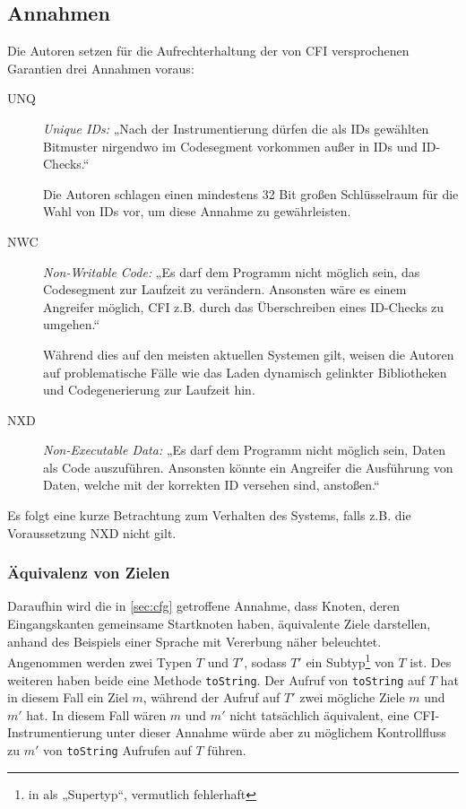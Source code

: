 \documentclass[11pt]{article}
\begin{document}
\subsection{Annahmen}


Die Autoren setzen für die Aufrechterhaltung der von CFI versprochenen
Garantien drei Annahmen voraus:

\begin{description}

  \item [UNQ] \emph{Unique IDs:} „Nach der Instrumentierung dürfen die als IDs
  gewählten Bitmuster nirgendwo im Codesegment vorkommen außer in IDs und
  ID-Checks.“

  Die Autoren schlagen einen mindestens 32 Bit großen Schlüsselraum für die
  Wahl von IDs vor, um diese Annahme zu gewährleisten.

  \item [NWC] \emph{Non-Writable Code:} „Es darf dem Programm nicht möglich
  sein, das Codesegment zur Laufzeit zu verändern. Ansonsten wäre es einem
  Angreifer möglich, CFI z.B. durch das Überschreiben eines ID-Checks zu
  umgehen.“

  Während dies auf den meisten aktuellen Systemen gilt, weisen die Autoren auf
  problematische Fälle wie das Laden dynamisch gelinkter Bibliotheken und
  Codegenerierung zur Laufzeit hin.

  \item [NXD] \emph{Non-Executable Data:} „Es darf dem Programm nicht möglich
  sein, Daten als Code auszuführen. Ansonsten könnte ein Angreifer die
  Ausführung von Daten, welche mit der korrekten ID versehen sind, anstoßen.“

\end{description}

Es folgt eine kurze Betrachtung zum Verhalten des Systems, falls z.B. die
Voraussetzung NXD nicht gilt.

\subsubsection{Äquivalenz von Zielen}

Daraufhin wird die in \ref{sec:cfg} getroffene Annahme, dass Knoten, deren
Eingangskanten gemeinsame Startknoten haben, äquivalente Ziele darstellen,
anhand des Beispiels einer Sprache mit Vererbung näher beleuchtet. Angenommen
werden zwei Typen $ T $ und $ T' $, sodass $ T' $ ein Subtyp\footnote{in
\cite{abadi-2005-control-msr} als „Supertyp“, vermutlich fehlerhaft} von
$ T $ ist.  Des weiteren haben beide eine Methode \texttt{toString}. Der Aufruf
von \texttt{toString} auf $ T $ hat in diesem Fall ein Ziel $ m $, während der
Aufruf auf $ T' $ zwei mögliche Ziele $ m $ und $ m' $ hat. In diesem Fall
wären $ m $ und $ m' $ nicht tatsächlich äquivalent, eine CFI-Instrumentierung
unter dieser Annahme würde aber zu möglichem Kontrollfluss zu $ m' $ von
\texttt{toString} Aufrufen auf $ T $ führen.
\end{document}
